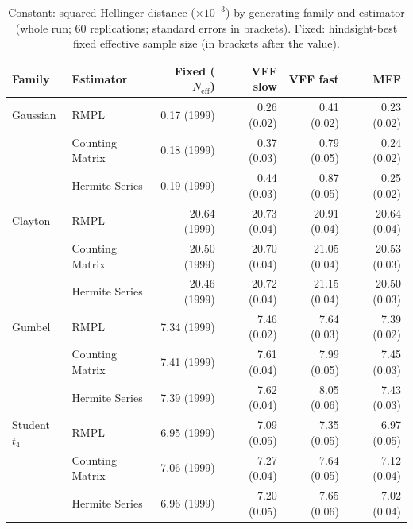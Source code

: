 \begin{table}[htbp]
\centering
\small
\caption{Constant: squared Hellinger distance ($\times10^{-3}$) by generating family and estimator (whole run; 60 replications; standard errors in brackets). Fixed: hindsight-best fixed effective sample size (in brackets after the value).}
\label{tab:app-strategy-h2-constant}
\begin{tabular}{llrrrr}
\toprule
Family & Estimator & Fixed ($N_{\mathrm{eff}}$) & VFF slow & VFF fast & MFF \\
\midrule
Gaussian & RMPL & 0.17 (1999) & 0.26 (0.02) & 0.41 (0.02) & 0.23 (0.02) \\
 & Counting Matrix & 0.18 (1999) & 0.37 (0.03) & 0.79 (0.05) & 0.24 (0.02) \\
 & Hermite Series & 0.19 (1999) & 0.44 (0.03) & 0.87 (0.05) & 0.25 (0.02) \\
\addlinespace
Clayton & RMPL & 20.64 (1999) & 20.73 (0.04) & 20.91 (0.04) & 20.64 (0.04) \\
 & Counting Matrix & 20.50 (1999) & 20.70 (0.04) & 21.05 (0.04) & 20.53 (0.03) \\
 & Hermite Series & 20.46 (1999) & 20.72 (0.04) & 21.15 (0.04) & 20.50 (0.03) \\
\addlinespace
Gumbel & RMPL & 7.34 (1999) & 7.46 (0.02) & 7.64 (0.03) & 7.39 (0.02) \\
 & Counting Matrix & 7.41 (1999) & 7.61 (0.04) & 7.99 (0.05) & 7.45 (0.03) \\
 & Hermite Series & 7.39 (1999) & 7.62 (0.04) & 8.05 (0.06) & 7.43 (0.03) \\
\addlinespace
Student $t_4$ & RMPL & 6.95 (1999) & 7.09 (0.05) & 7.35 (0.05) & 6.97 (0.05) \\
 & Counting Matrix & 7.06 (1999) & 7.27 (0.04) & 7.64 (0.05) & 7.12 (0.04) \\
 & Hermite Series & 6.96 (1999) & 7.20 (0.05) & 7.65 (0.06) & 7.02 (0.04) \\
\bottomrule
\end{tabular}
\end{table}

